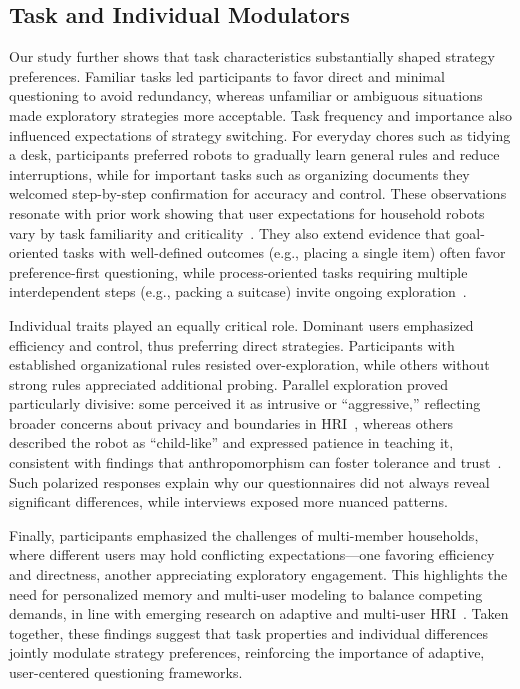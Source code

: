 \documentclass[sigconf,authordraft]{acmart}
\begin{document}
\subsection{Task and Individual Modulators}
Our study further shows that task characteristics substantially shaped strategy preferences. Familiar tasks led participants to favor direct and minimal questioning to avoid redundancy, whereas unfamiliar or ambiguous situations made exploratory strategies more acceptable. Task frequency and importance also influenced expectations of strategy switching. For everyday chores such as tidying a desk, participants preferred robots to gradually learn general rules and reduce interruptions, while for important tasks such as organizing documents they welcomed step-by-step confirmation for accuracy and control. These observations resonate with prior work showing that user expectations for household robots vary by task familiarity and criticality~\cite{yoo_2024_preferences,bansal_2020_supportive}. They also extend evidence that goal-oriented tasks with well-defined outcomes (e.g., placing a single item) often favor preference-first questioning, while process-oriented tasks requiring multiple interdependent steps (e.g., packing a suitcase) invite ongoing exploration~\cite{hu2025task}. 

Individual traits played an equally critical role. Dominant users emphasized efficiency and control, thus preferring direct strategies. Participants with established organizational rules resisted over-exploration, while others without strong rules appreciated additional probing. Parallel exploration proved particularly divisive: some perceived it as intrusive or “aggressive,” reflecting broader concerns about privacy and boundaries in HRI~\cite{cucciniello2023mind}, whereas others described the robot as “child-like” and expressed patience in teaching it, consistent with findings that anthropomorphism can foster tolerance and trust~\cite{de2016almost}. Such polarized responses explain why our questionnaires did not always reveal significant differences, while interviews exposed more nuanced patterns. 

Finally, participants emphasized the challenges of multi-member households, where different users may hold conflicting expectations—one favoring efficiency and directness, another appreciating exploratory engagement. This highlights the need for personalized memory and multi-user modeling to balance competing demands, in line with emerging research on adaptive and multi-user HRI~\cite{rosenthal2010mixed}. Taken together, these findings suggest that task properties and individual differences jointly modulate strategy preferences, reinforcing the importance of adaptive, user-centered questioning frameworks. 
\end{document}
